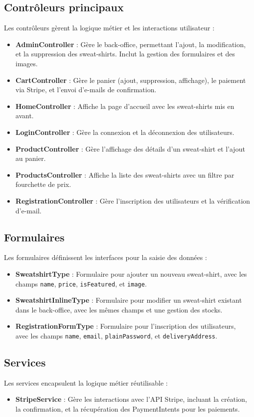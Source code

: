 \documentclass[a4paper,11pt]{article}
\begin{document}
\subsection{Contrôleurs principaux}
Les contrôleurs gèrent la logique métier et les interactions utilisateur :
\begin{itemize}
    \item \textbf{AdminController} : Gère le back-office, permettant l'ajout, la modification, et la suppression des sweat-shirts. Inclut la gestion des formulaires et des images.
    \item \textbf{CartController} : Gère le panier (ajout, suppression, affichage), le paiement via Stripe, et l'envoi d'e-mails de confirmation.
    \item \textbf{HomeController} : Affiche la page d'accueil avec les sweat-shirts mis en avant.
    \item \textbf{LoginController} : Gère la connexion et la déconnexion des utilisateurs.
    \item \textbf{ProductController} : Gère l'affichage des détails d'un sweat-shirt et l'ajout au panier.
    \item \textbf{ProductsController} : Affiche la liste des sweat-shirts avec un filtre par fourchette de prix.
    \item \textbf{RegistrationController} : Gère l'inscription des utilisateurs et la vérification d'e-mail.
\end{itemize}

\subsection{Formulaires}
Les formulaires définissent les interfaces pour la saisie des données :
\begin{itemize}
    \item \textbf{SweatshirtType} : Formulaire pour ajouter un nouveau sweat-shirt, avec les champs \texttt{name}, \texttt{price}, \texttt{isFeatured}, et \texttt{image}.
    \item \textbf{SweatshirtInlineType} : Formulaire pour modifier un sweat-shirt existant dans le back-office, avec les mêmes champs et une gestion des stocks.
    \item \textbf{RegistrationFormType} : Formulaire pour l'inscription des utilisateurs, avec les champs \texttt{name}, \texttt{email}, \texttt{plainPassword}, et \texttt{deliveryAddress}.
\end{itemize}

\subsection{Services}
Les services encapsulent la logique métier réutilisable :
\begin{itemize}
    \item \textbf{StripeService} : Gère les interactions avec l'API Stripe, incluant la création, la confirmation, et la récupération des PaymentIntents pour les paiements.
\end{itemize}
\end{document}
